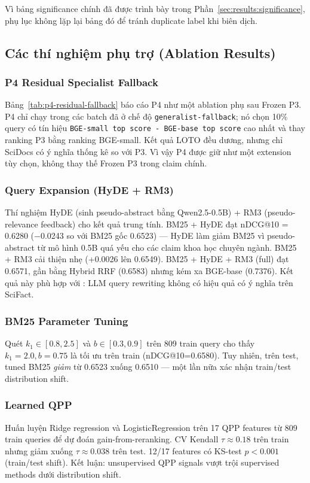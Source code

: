 Vì bảng significance chính đã được trình bày trong Phần~\ref{sec:results:significance}, phụ lục không
lặp lại bảng đó để tránh duplicate label khi biên dịch.

\subsection{Các thí nghiệm phụ trợ (Ablation Results)}

\subsubsection{P4 Residual Specialist Fallback}
Bảng~\ref{tab:p4-residual-fallback} báo cáo P4 như một ablation phụ sau Frozen P3. P4 chỉ chạy trong
các batch đã ở chế độ \texttt{generalist-fallback}; nó chọn 10\% query có tín hiệu
\texttt{BGE-small top score - BGE-base top score} cao nhất và thay ranking P3 bằng ranking BGE-small.
Kết quả LOTO đều dương, nhưng chỉ SciDocs có ý nghĩa thống kê so với P3. Vì vậy P4 được giữ như một
extension tùy chọn, không thay thế Frozen P3 trong claim chính.



\subsubsection{Query Expansion (HyDE + RM3)}
Thí nghiệm HyDE (sinh pseudo-abstract bằng Qwen2.5-0.5B) + RM3 (pseudo-relevance feedback) cho kết quả
trung tính. BM25 + HyDE đạt nDCG@10 = 0.6280 ($-$0.0243 so với BM25 gốc 0.6523) --- HyDE làm giảm BM25
vì pseudo-abstract từ mô hình 0.5B quá yếu cho các claim khoa học chuyên ngành. BM25 + RM3 cải thiện
nhẹ (+0.0026 lên 0.6549). BM25 + HyDE + RM3 (full) đạt 0.6571, gần bằng Hybrid RRF (0.6583) nhưng kém
xa BGE-base (0.7376). Kết quả này phù hợp với \citet{anonymous2025notallqueries}: LLM query rewriting
không có hiệu quả có ý nghĩa trên SciFact.

\subsubsection{BM25 Parameter Tuning}
Quét $k_1 \in [0.8, 2.5]$ và $b \in [0.3, 0.9]$ trên 809 train query cho thấy $k_1=2.0, b=0.75$ là
tối ưu trên train (nDCG@10=0.6580). Tuy nhiên, trên test, tuned BM25 \emph{giảm} từ 0.6523 xuống
0.6510 --- một lần nữa xác nhận train/test distribution shift.

\subsubsection{Learned QPP}
Huấn luyện Ridge regression và LogisticRegression trên 17 QPP features từ 809 train queries để dự
đoán gain-from-reranking. CV Kendall $\tau \approx 0.18$ trên train nhưng giảm xuống $\tau \approx 0.038$
trên test. 12/17 features có KS-test $p < 0.001$ (train/test shift). Kết luận: unsupervised QPP
signals vượt trội supervised methods dưới distribution shift.

